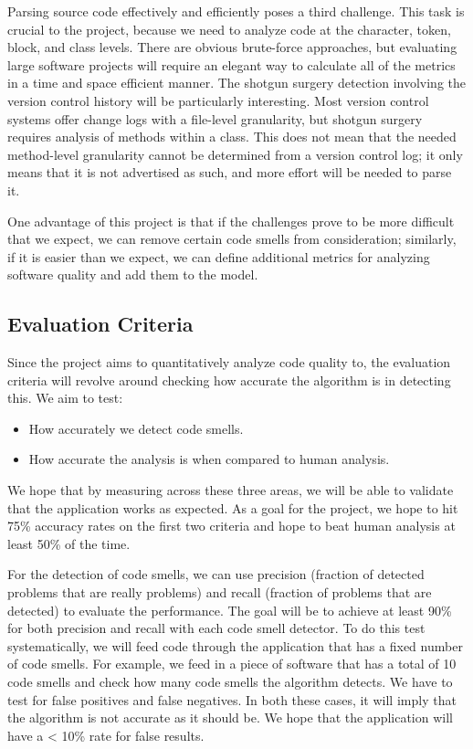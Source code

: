 \documentclass{sig-alternate}
\begin{document}
Parsing source code effectively and efficiently poses a third challenge. This task is crucial to the project, because we need to analyze code at the character, token, block, and class levels. There are obvious brute-force approaches, but evaluating large software projects will require an elegant way to calculate all of the metrics in a time and space efficient manner. The shotgun surgery detection involving the version control history will be particularly interesting. Most version control systems offer change logs with a file-level granularity, but shotgun surgery requires analysis of methods within a class. This does not mean that the needed method-level granularity cannot be determined from a version control log; it only means that it is not advertised as such, and more effort will be needed to parse it. 

One advantage of this project is that if the challenges prove to be more difficult that we expect, we can remove certain code smells from consideration; similarly, if it is easier than we expect, we can define additional metrics for analyzing software quality and add them to the model.

\subsection{Evaluation Criteria}
\label{subsec:eval_criteria}

Since the project aims to quantitatively analyze code quality to, the evaluation criteria will revolve around checking how accurate the algorithm is in detecting this. We aim to test:

\begin{itemize}
\item How accurately we detect code smells.
\item How accurate the analysis is when compared to human analysis.
\end{itemize}

We hope that by measuring across these three areas, we will be able to validate that the application works as expected. As a goal for the project, we hope to hit 75\% accuracy rates on the first two criteria and hope to beat human analysis at least 50\% of the time.

For the detection of code smells, we can use precision (fraction of detected problems that are really problems) and recall (fraction of problems that are detected) to evaluate the performance. The goal will be to achieve at least 90\% for both precision and recall with each code smell detector. To do this test systematically, we will feed code through the application that has a fixed number of code smells. For example, we feed in a piece of software that has a total of 10 code smells and check how many code smells the algorithm detects. We have to test for false positives and false negatives. In both these cases, it will imply that the algorithm is not accurate as it should be. We hope that the application will have a < 10\% rate for false results. 
\end{document}
